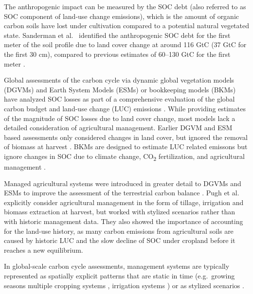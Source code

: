 \documentclass[gc, manuscript]{copernicus}
\begin{document}
The anthropogenic impact can be measured by the SOC debt (also referred to as SOC component of land-use change emissions), which is the amount of organic carbon soils have lost under cultivation compared to a potential natural vegetated state. Sanderman et al.~\citeyearpar{sanderman_soil_2017} identified the anthropogenic SOC debt for the first meter of the soil profile due to land cover change at around 116 GtC (37 GtC for the first 30 cm), compared to previous estimates of 60--130 GtC for the first meter \citep{lal_world_2001}.

Global assessments of the carbon cycle via dynamic global vegetation models (DGVMs) and Earth System Models (ESMs) or bookkeeping models (BKMs) have analyzed SOC losses as part of a comprehensive evaluation of the global carbon budget and land-use change (LUC) emissions \citep{friedlingstein_global_2019}. While providing estimates of the magnitude of SOC losses due to land cover change, most models lack a detailed consideration of agricultural management. Earlier DGVM and ESM based assessments only considered changes in land cover, but ignored the removal of biomass at harvest \citep{strassmann_simulating_2008, betts_climate_2015}. BKMs are designed to estimate LUC related emissons but ignore changes in SOC due to climate change, CO\textsubscript{2} fertilization, and agricultural management \citep{friedlingstein_global_2019, houghton_carbon_2012, hansis_relevance_2015}.

Managed agricultural systems were introduced in greater detail to DGVMs and ESMs to improve the assessment of the terrestrial carbon balance \citep[e.g.~][]{bondeau_modelling_2007, lindeskog_implications_2013}. Pugh et al.~\citeyearpar{pugh_simulated_2015} explicitly consider agricultural management in the form of tillage, irrigation and biomass extraction at harvest, but worked with stylized scenarios rather than with historic management data. They also showed the importance of accounting for the land-use history, as many carbon emissions from agricultural soils are caused by historic LUC and the slow decline of SOC under cropland before it reaches a new equilibrium.

In global-scale carbon cycle assessments, management systems are typically represented as spatially explicit patterns that are static in time (e.g.~growing seasons \citep{portmann_mirca2000global_2010} multiple cropping systems \citep{waha_multiple_2020}, irrigation systems \citep{jagermeyr_water_2015}) or as stylized scenarios \citep[e.g.~][\citet{lutz_simulating_2019}]{pugh_simulated_2015}.
\end{document}

